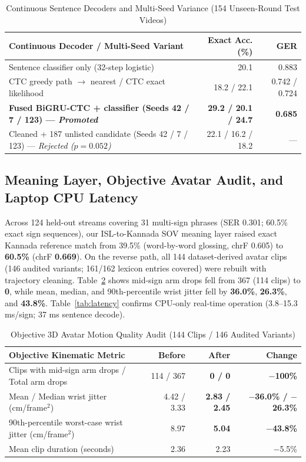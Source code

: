 \documentclass[a4paper,12pt]{article}
\begin{document}
\begin{table}[h!]
\centering
\caption{Continuous Sentence Decoders and Multi-Seed Variance (154 Unseen-Round Test Videos)}
\label{tab:sentences}
\small
\begin{tabular}{lrr}
\toprule
\textbf{Continuous Decoder / Multi-Seed Variant} & \textbf{Exact Acc. (\%)} & \textbf{GER} \\
\midrule
Sentence classifier only (32-step logistic) & 20.1 & 0.883 \\
CTC greedy path $\rightarrow$ nearest / CTC exact likelihood & 18.2 / 22.1 & 0.742 / 0.724 \\
\textbf{Fused BiGRU-CTC + classifier (Seeds 42 / 7 / 123) --- \textit{Promoted}} & \textbf{29.2 / 20.1 / 24.7} & \textbf{0.685} \\
Cleaned + 187 unlisted candidate (Seeds 42 / 7 / 123) --- \textit{Rejected ($p=0.052$)} & 22.1 / 16.2 / 18.2 & --- \\
\bottomrule
\end{tabular}
\end{table}

\subsection{Meaning Layer, Objective Avatar Audit, and Laptop CPU Latency}
Across 124 held-out streams covering 31 multi-sign phrases (SER 0.301; 60.5\% exact sign sequences), our ISL-to-Kannada SOV meaning layer raised exact Kannada reference match from 39.5\% (word-by-word glossing, chrF 0.605) to \textbf{60.5\%} (chrF \textbf{0.669}). On the reverse path, all 144 dataset-derived avatar clips (146 audited variants; 161/162 lexicon entries covered) were rebuilt with trajectory cleaning. Table~\ref{tab:avatar} shows mid-sign arm drops fell from 367 (114 clips) to \textbf{0}, while mean, median, and 90th-percentile wrist jitter fell by \textbf{36.0\%}, \textbf{26.3\%}, and \textbf{43.8\%}. Table~\ref{tab:latency} confirms CPU-only real-time operation (3.8--15.3 ms/sign; 37 ms sentence decode).

\begin{table}[h!]
\centering
\caption{Objective 3D Avatar Motion Quality Audit (144 Clips / 146 Audited Variants)}
\label{tab:avatar}
\small
\begin{tabular}{lrrr}
\toprule
\textbf{Objective Kinematic Metric} & \textbf{Before} & \textbf{After} & \textbf{Change} \\
\midrule
Clips with mid-sign arm drops / Total arm drops & 114 / 367 & \textbf{0 / 0} & \textbf{$-$100\%} \\
Mean / Median wrist jitter (cm/frame$^2$) & 4.42 / 3.33 & \textbf{2.83 / 2.45} & \textbf{$-$36.0\% / $-$26.3\%} \\
90th-percentile worst-case wrist jitter (cm/frame$^2$) & 8.97 & \textbf{5.04} & \textbf{$-$43.8\%} \\
Mean clip duration (seconds) & 2.36 & 2.23 & $-$5.5\% \\
\bottomrule
\end{tabular}
\end{table}
\end{document}
